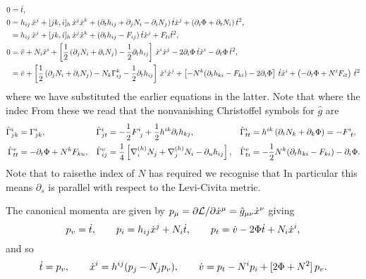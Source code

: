 \documentclass{article}
\begin{document}
\begin{align*}
0&=\ddot t,\\
0&= h_{ij}\,\ddot x\sp{j}+[jk,i]_h\, \dot x\sp{j} \dot x\sp{k} +
(\partial_t h_{ij}+\partial_j N_i-\partial_i N_j) \,\dot t \dot x\sp{j} +\left(\partial_i\Phi+\partial_t N_i\right) \dot t^2,\\
&= h_{ij}\,\ddot x\sp{j}+[jk,i]_h\, \dot x\sp{j} \dot x\sp{k}+ (\partial_t h_{ij} -F_{ij})\, \dot t \dot x\sp{j}
+F_{ti}\dot t\sp2,\\
0&=\ddot v+ N_i\ddot x\sp{i}+ \left[ \frac12 \left(\partial_j N_i+\partial_i N_j\right)- \frac12 \partial_t h_{ij}
\right]\,\dot x\sp{i} \dot x\sp{j} -2\partial_i\Phi \,\dot t \dot x\sp{i} - \partial_t\Phi\, \dot t^2,\\
&=\ddot v+
 \left[ \frac12 \left(\partial_j N_i+\partial_i N_j\right)-N_k \Gamma\sp{k}_{ij}- \frac12 \partial_t h_{ij}
\right]\,\dot x\sp{i} \dot x\sp{j} 
+\left[ -N\sp{k} (\partial_t h_{ki} -F_{ki}) -2\partial_i\Phi \right]\,\dot t \dot x\sp{i} 
+\left(- \partial_t\Phi +N\sp{i}F_{it} \right)\, \dot t^2
\end{align*}
where we have substituted the earlier equations in the latter. Note that where the indec From these we read that
the nonvanishing Christoffel symbols for $\hat g$ are
\begin{align*}
\hat \Gamma\sp{i}_{jk}&=  \Gamma\sp{i}_{jk},
&\hat \Gamma\sp{i}_{jt}&=-\frac12 F\sp{i}_{\ j}+\frac12 h\sp{ik}\partial_t h_{kj},
&\hat \Gamma\sp{i}_{tt}&=h\sp{ik} \left( \partial_t N_k +\partial_{k} \Phi \right)= -F\sp{i}_{\ t},
\\
\hat \Gamma\sp{v}_{tt}&=-\partial_t \Phi+N\sp{k}F_{ku}, 
&\hat \Gamma\sp{v}_{ij}&=\frac14\left[\nabla\sp{(h)}_{i}N_{j}+\nabla\sp{(h)}_{j}N_{i}-\partial_u h_{ij}\right],
&\hat \Gamma\sp{v}_{ti}&=-\frac12 N\sp{k} (\partial_t h_{ki} -F_{ki}) -\partial_i\Phi .
\end{align*}
Note that to raisethe index of $N$ has required we recognise that 
In particular this means $\partial_s$ is parallel with respect to the Levi-Civita metric.


The canonical momenta are given by $p_\mu =\partial \mathcal{L}/\partial \dot x\sp{\mu}=\hat{g}_{\mu\nu}\dot{x}^\nu$ giving
$$p_v =\dot t,\qquad p_i=h_{ij} \dot x\sp{j} +N_i \dot t, \qquad p_t=\dot v- 2\Phi \dot t +N_i \dot x\sp{i},
$$
and so
$$\dot t=p_v,\qquad  \dot x\sp{i}=h\sp{ij}(p_j- N_j p_v),\qquad \dot v=p_t-N\sp{i} p_i+[2\Phi +N^2]\, p_v.$$
\end{document}
